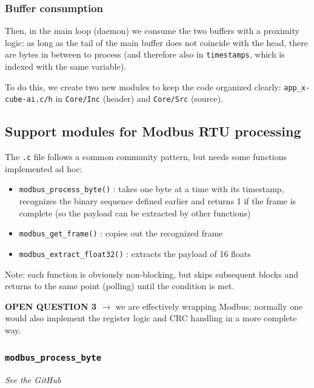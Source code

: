 \subsubsection{Buffer consumption}

Then, in the main loop (daemon) we consume the two buffers with a proximity logic: as long as the tail of the main buffer does not coincide with the head, there are bytes in between to process (and therefore also in \texttt{timestamps}, which is indexed with the same variable).

To do this, we create two new modules to keep the code organized clearly: \texttt{app\_x-cube-ai.c/h} in \texttt{Core/Inc} (header) and \texttt{Core/Src} (source).

\subsection{Support modules for Modbus RTU processing}

The \texttt{.c} file follows a common community pattern, but needs some functions implemented ad hoc:

\begin{itemize}
    \item \texttt{modbus\_process\_byte()} : takes one byte at a time with its timestamp, recognizes the binary sequence defined earlier and returns 1 if the frame is complete (so the payload can be extracted by other functions)
    \item \texttt{modbus\_get\_frame()} : copies out the recognized frame
    \item \texttt{modbus\_extract\_float32()} : extracts the payload of 16 floats
\end{itemize}

Note: each function is obviously non-blocking, but skips subsequent blocks and returns to the same point (polling) until the condition is met.

\textbf{OPEN QUESTION 3 $\rightarrow$} we are effectively wrapping Modbus; normally one would also implement the register logic and CRC handling in a more complete way.

\subsubsection{\texttt{modbus\_process\_byte}}

\begin{center}
    \textit{See the GitHub}
\end{center}


